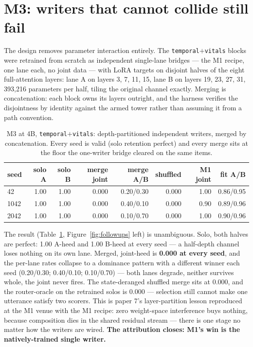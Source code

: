 \documentclass[11pt]{article}
\begin{document}
\section{M3: writers that cannot collide still fail}

The design removes parameter interaction entirely. The
\texttt{temporal$+$vitals} blocks were retrained from scratch
as independent single-lane bridges --- the M1 recipe, one lane each, no
joint data --- with LoRA targets on disjoint halves of the eight
full-attention layers: lane A on layers
3, 7, 11, 15, lane B on layers
19, 23, 27, 31, 393,216
parameters per half, tiling the original channel exactly. Merging is
concatenation: each block owns its layers outright, and the harness
verifies the disjointness by identity against the armed tower rather
than assuming it from a path convention.

\begin{table}[t]
\centering
\small
\setlength{\tabcolsep}{5pt}
\begin{tabular}{lrrrrrrr}
\toprule
seed & solo A & solo B & merge joint & merge A/B & shuffled & M1 joint & fit A/B \\
\midrule
42 & 1.00 & 1.00 & 0.000 & 0.20/0.30 & 0.000 & 1.00 & 0.86/0.95 \\
1042 & 1.00 & 1.00 & 0.000 & 0.40/0.10 & 0.000 & 0.90 & 0.89/0.96 \\
2042 & 1.00 & 1.00 & 0.000 & 0.10/0.70 & 0.000 & 1.00 & 0.90/0.96 \\
\bottomrule
\end{tabular}
\caption{M3 at 4B, \texttt{temporal$+$vitals}: depth-partitioned
independent writers, merged by concatenation. Every seed is valid (solo
retention perfect) and every merge sits at the floor the one-writer
bridge cleared on the same items.}
\label{tab:m3}
\end{table}

The result (Table~\ref{tab:m3}, Figure~\ref{fig:followups} left) is
unambiguous. Solo, both halves are perfect: 1.00 A-heed and
1.00 B-heed at every seed --- a half-depth channel loses
nothing on its own lane. Merged, joint-heed is \textbf{0.000 at every
seed}, and the per-lane rates collapse to a dominance pattern with a
different winner each seed
(0.20/0.30; 0.40/0.10; 0.10/0.70)
--- both lanes degrade, neither survives whole, the joint never fires.
The state-deranged shuffled merge sits at 0.000, and the router-oracle
on the retrained solos is 0.000 --- selection still cannot make one
utterance satisfy two scorers. This is paper 7's layer-partition lesson
reproduced at the M1 venue with the M1 recipe: zero weight-space
interference buys nothing, because composition dies in the shared
residual stream --- there is one stage no matter how the writers are
wired. \textbf{The attribution closes: M1's win is the natively-trained
single writer.}
\end{document}
